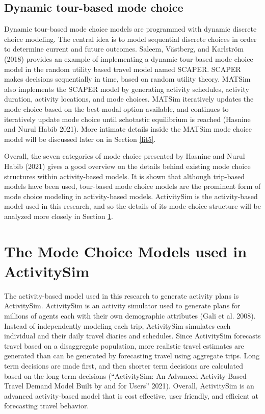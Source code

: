 \documentclass[12pt, oneside, openright]{byuthesis}
\begin{document}
\hypertarget{lit37}{%
\subsection{Dynamic tour-based mode choice}\label{lit37}}

Dynamic tour-based mode choice models are programmed with dynamic discrete choice modeling. The central idea is to model sequential discrete choices in order to determine current and future outcomes. Saleem, Västberg, and Karlström (2018) provides an example of implementing a dynamic tour-based mode choice model in the random utility based travel model named SCAPER. SCAPER makes decisions sequentially in time, based on random utility theory. MATSim also implements the SCAPER model by generating activity schedules, activity duration, activity locations, and mode choices. MATSim iteratively updates the mode choice based on the best modal option available, and continues to iteratively update mode choice until schotastic equilibrium is reached (Hasnine and Nurul Habib 2021). More intimate details inside the MATSim mode choice model will be discussed later on in Section \ref{lit5}.

Overall, the seven categories of mode choice presented by Hasnine and Nurul Habib (2021) gives a good overview on the details behind existing mode choice structures within activity-based models. It is shown that although trip-based models have been used, tour-based mode choice models are the prominent form of mode choice modeling in activity-based models. ActivitySim is the activity-based model used in this research, and so the details of its mode choice structure will be analyzed more closely in Section \ref{lit4}.

\hypertarget{lit4}{%
\section{The Mode Choice Models used in ActivitySim}\label{lit4}}

The activity-based model used in this research to generate activity plans is ActivitySim. ActivitySim is an activity simulator used to generate plans for millions of agents each with their own demographic attributes (Gali et al. 2008). Instead of independently modeling each trip, ActivitySim simulates each individual and their daily travel diaries and schedules. Since ActivitySim forecasts travel based on a disaggregate population, more realistic travel estimates are generated than can be generated by forecasting travel using aggregate trips. Long term decisions are made first, and then shorter term decisions are calculated based on the long term decisions ({``ActivitySim: An Advanced Activity-Based Travel Demand Model Built by and for Users''} 2021). Overall, ActivitySim is an advanced activity-based model that is cost effective, user friendly, and efficient at forecasting travel behavior.
\end{document}
